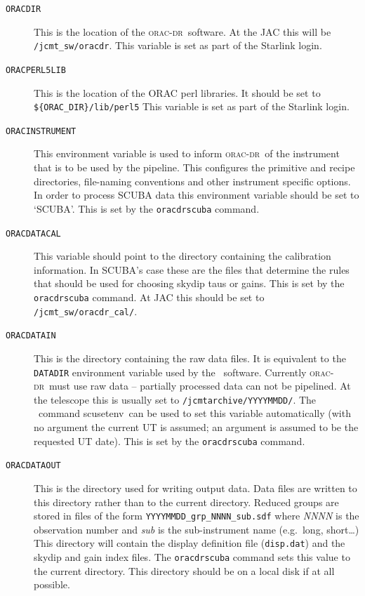 \documentclass[twoside,11pt]{article}
\newcommand{\xref}[3]{#1}
\renewcommand{\_}{\texttt{\symbol{95}}}
\newcommand{\oracdr}{\xref{\textsc{orac-dr}}{sun230}{}}
\newcommand{\task}[1]{{\textsf{#1}}}
\newcommand{\SURF}{\xref{{\sc{Surf}}}{sun216}{}}
\newcommand{\scusetenv}{\xref{\task{scusetenv}}{sun216}{SCUSETENV}}
\begin{document}
\begin{description}
\item[\texttt{ORAC\_DIR}] \mbox{}

This is the location of the \oracdr\ software. At the JAC this will be
\verb|/jcmt_sw/oracdr|. This variable is set as part of the Starlink
login.

\item[\texttt{ORAC\_PERL5LIB}] \mbox{}

This is the location of the ORAC perl libraries. It should be set to
\verb|${ORAC_DIR}/lib/perl5|   %
This variable is set as part of the Starlink login.

\item[\texttt{ORAC\_INSTRUMENT}] \mbox{}

This environment variable is used to inform \oracdr\ of the instrument
that is to be used by the pipeline. This configures the primitive and recipe
directories, file-naming conventions and other instrument specific
options. In order to process SCUBA data this environment variable should
be set to `SCUBA'. This is set by the \texttt{oracdr\_scuba} command.

\item[\texttt{ORAC\_DATA\_CAL}] \mbox{}

This variable should point to the directory containing the calibration
information. In SCUBA's case these are the files that determine the rules 
that should be used for choosing skydip taus or gains. 
This is set by the \texttt{oracdr\_scuba} command.
At JAC this should be set to \verb|/jcmt_sw/oracdr_cal/|.

\item[\texttt{ORAC\_DATA\_IN}] \mbox{}

This is the directory containing the raw data files. It is equivalent
to the \texttt{DATADIR} environment variable used by the \SURF\ software. 
Currently \oracdr\ must use raw data -- partially processed data can not
be pipelined. At the telescope this is usually set to
\verb|/jcmtarchive/YYYYMMDD/|. The \SURF\ command \scusetenv\
can be used to set this variable automatically (with no argument
the current UT is assumed; an argument is assumed to be the requested
UT date). This is set by the \texttt{oracdr\_scuba} command.

\item[\texttt{ORAC\_DATA\_OUT}] \mbox{}

This is the directory used for writing output data. Data files are
written to this directory rather than to the current directory.
Reduced groups are stored in files of the form
\verb|YYYYMMDD_grp_NNNN_sub.sdf| where \textit{NNNN} is the observation
number and \textit{sub} is the sub-instrument name (e.g.\ long, short\ldots)
This directory will contain the display definition file (\verb|disp.dat|)
and the skydip and gain index files. The \texttt{oracdr\_scuba}
command sets this value to the current directory. This directory
should be on a local disk if at all possible.

\end{description}
\end{document}
